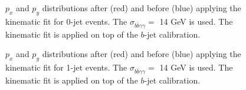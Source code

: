 \begin{figure}[htbp]
   \centering
   \caption{$p_x$ and $p_y$ distributions after (red) and before (blue) applying the kinematic fit for 0-jet events. The $\sigma_{b\bar{b}\gamma\gamma} = $ 14 GeV is used. The kinematic fit is applied on top of the $b$-jet calibration.}
   \label{fig:Adx4:HH:0Jet}
\end{figure}
\begin{figure}[htbp]
   \centering
   \caption{$p_x$ and $p_y$ distributions after (red) and before (blue) applying the kinematic fit for 1-jet events. The $\sigma_{b\bar{b}\gamma\gamma} = $ 14 GeV is used. The kinematic fit is applied on top of the $b$-jet calibration.}
   \label{fig:Adx4:HH:1Jet}
\end{figure}


